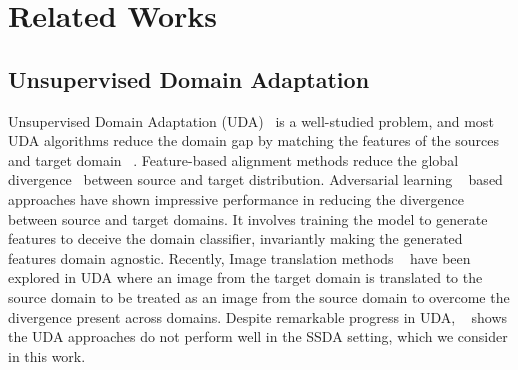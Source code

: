 \section{Related Works}
\subsection{Unsupervised Domain Adaptation}
Unsupervised Domain Adaptation (UDA)~\cite{Gopalan2011DomainAF}  is a well-studied problem, and most UDA algorithms reduce the domain gap by matching the features of the sources and target domain ~\cite{Gretton2012AKT, Bousmalis2016DomainSN, Shen2018WassersteinDG, Long2016UnsupervisedDA, Sun2016DeepCC, Kang2018DeepAA}. Feature-based alignment methods reduce the global divergence~\cite{Gretton2012AKT, Sun2016DeepCC} between source and target distribution. Adversarial learning ~\cite{Ganin2015UnsupervisedDA, Chen2019JointDA, Long2015LearningTF, Long2018ConditionalAD, Pei2018MultiAdversarialDA, Paul2020DomainAS} based approaches have shown impressive performance in reducing the divergence between source and target domains. It involves training the model to generate features to deceive the domain classifier, invariantly making the generated features domain agnostic. Recently, Image translation methods ~\cite{Hoffman2018CyCADACA, Hu2018DuplexGA, Murez2018ImageTI} have been explored in UDA where an image from the target domain is translated to the source domain to be treated as an image from the source domain to overcome the divergence present across domains. Despite remarkable progress in UDA, ~\cite{Saito2019SemiSupervisedDA} shows the UDA approaches do not perform well in the SSDA setting, which we consider in this work.


